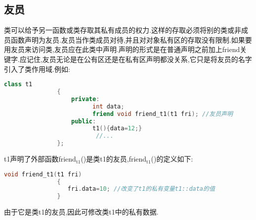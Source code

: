 \documentclass{article}
\begin{document}
\subsection{友员}
\label{sec-2-4}
类可以给予另一函数或类存取其私有成员的权力.这样的存取必须将别的类或非成员函数声明为友员.友员当作类成员对待,并且对对象私有区的存取没有限制.如果要用友员来访问类,友员应在此类中声明.声明的形式是在普通声明之前加上friend关键字.应记住,友员无论是在公有区还是在私有区声明都没关系,它只是将友员的名字引入了类作用域.例如:
\begin{lstlisting}[language=c++]
               class t1
               {
                   private:
                         int data;
                         friend void friend_t1(t1 fri); //友员声明
                   public:
                         t1(){data=12;}
                          //...
               };
\end{lstlisting}
t1声明了外部函数friend$_{\text{t1}}$()是类t1的友员,friend$_{\text{t1}}$()的定义如下:
\begin{lstlisting}[language=c++]
               void friend_t1(t1 fri)
               {
                  fri.data=10; //改变了t1的私有变量t1::data的值
               }
\end{lstlisting}
由于它是类t1的友员,因此可修改类t1中的私有数据.
\end{document}
